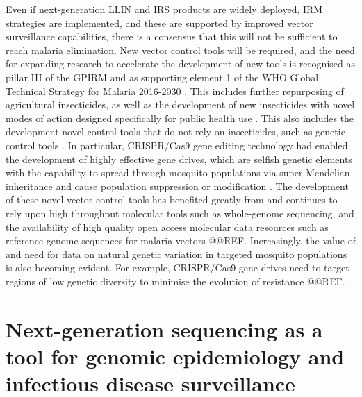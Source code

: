 \documentclass[a4paper,11pt,abstracton,hidelinks]{scrartcl}
\begin{document}
 
Even if next-generation LLIN and IRS products are widely deployed, IRM strategies are implemented, and these are supported by improved vector surveillance capabilities, there is a consensus that this will not be sufficient to reach malaria elimination.
%
New vector control tools will be required, and the need for expanding research to accelerate the development of new tools is recognised as pillar \RN{3} of the GPIRM \citep{WHO2012GPIRM} and as supporting element 1 of the WHO Global Technical Strategy for Malaria 2016-2030 \citep{WHO2015GTS}.
%
This includes further repurposing of agricultural insecticides, as well as the development of new insecticides with novel modes of action designed specifically for public health use \citep{Hemingway2006,Lees2019}.
%
This also includes the development novel control tools that do not rely on insecticides, such as genetic control tools \citep{Davidson1974,Burt2003}.
%
In particular, CRISPR/Cas9 gene editing technology had enabled the development of highly effective gene drives, which are selfish genetic elements with the capability to spread through mosquito populations via super-Mendelian inheritance and cause population suppression or modification \citep{Kyrou2018}.
%
The development of these novel vector control tools has benefited greatly from and continues to rely upon high throughput molecular tools such as whole-genome sequencing, and the availability of high quality open access molecular data resources such as reference genome sequences for malaria vectors @@REF.
%
Increasingly, the value of and need for data on natural genetic variation in targeted mosquito populations is also becoming evident.
%
For example, CRISPR/Cas9 gene drives need to target regions of low genetic diversity to minimise the evolution of resistance @@REF.


\section{Next-generation sequencing as a tool for genomic epidemiology and infectious disease surveillance}
\end{document}
